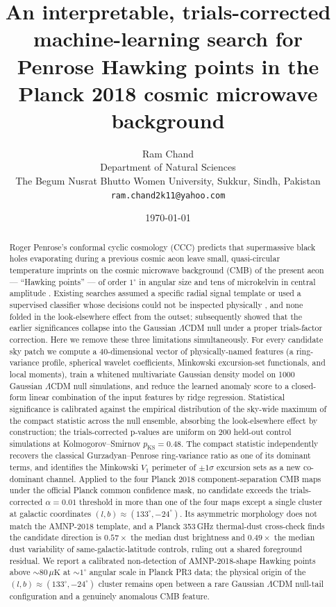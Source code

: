 \documentclass[11pt,a4paper]{article}
\title{An interpretable, trials-corrected machine-learning search for Penrose Hawking points in the Planck 2018 cosmic microwave background}
\author{Ram Chand \\
Department of Natural Sciences \\
The Begum Nusrat Bhutto Women University, Sukkur, Sindh, Pakistan \\
\texttt{ram.chand2k11@yahoo.com}}
\date{\today}
\begin{document}
\maketitle

\begin{abstract}
\noindent
Roger Penrose's conformal cyclic cosmology (CCC) predicts that supermassive black holes evaporating during a previous cosmic aeon leave small, quasi-circular temperature imprints on the cosmic microwave background (CMB) of the present aeon --- ``Hawking points'' --- of order $1^\circ$ in angular size and tens of microkelvin in central amplitude \citep{penrose_ccc_2010,an_amnp_2018}. Existing searches assumed a specific radial signal template \citep{gp_2010a,an_amnp_2018} or used a supervised classifier whose decisions could not be inspected physically \citep{bodnia_2022}, and none folded in the look-elsewhere effect from the outset; \citet{jow_scott_2020} subsequently showed that the earlier significances collapse into the Gaussian $\Lambda$CDM null under a proper trials-factor correction. Here we remove these three limitations simultaneously. For every candidate sky patch we compute a 40-dimensional vector of physically-named features (a ring-variance profile, spherical wavelet coefficients, Minkowski excursion-set functionals, and local moments), train a whitened multivariate Gaussian density model on 1000 Gaussian $\Lambda$CDM null simulations, and reduce the learned anomaly score to a closed-form linear combination of the input features by ridge regression. Statistical significance is calibrated against the empirical distribution of the sky-wide maximum of the compact statistic across the null ensemble, absorbing the look-elsewhere effect by construction; the trials-corrected p-values are uniform on 200 held-out control simulations at Kolmogorov--Smirnov $p_{\text{KS}} = 0.48$. The compact statistic independently recovers the classical Gurzadyan--Penrose ring-variance ratio as one of its dominant terms, and identifies the Minkowski $V_1$ perimeter of $\pm 1\sigma$ excursion sets as a new co-dominant channel. Applied to the four Planck 2018 component-separation CMB maps under the official Planck common confidence mask, no candidate exceeds the trials-corrected $\alpha = 0.01$ threshold in more than one of the four maps except a single cluster at galactic coordinates $(l, b) \approx (133^\circ, -24^\circ)$. Its asymmetric morphology does not match the AMNP-2018 template, and a Planck 353\,GHz thermal-dust cross-check finds the candidate direction is $0.57 \times$ the median dust brightness and $0.49 \times$ the median dust variability of same-galactic-latitude controls, ruling out a shared foreground residual. We report a calibrated non-detection of AMNP-2018-shape Hawking points above $\sim 80\,\mu\mathrm{K}$ at $\sim 1^\circ$ angular scale in Planck PR3 data; the physical origin of the $(l, b) \approx (133^\circ, -24^\circ)$ cluster remains open between a rare Gaussian $\Lambda$CDM null-tail configuration and a genuinely anomalous CMB feature.


\end{abstract}
\end{document}
